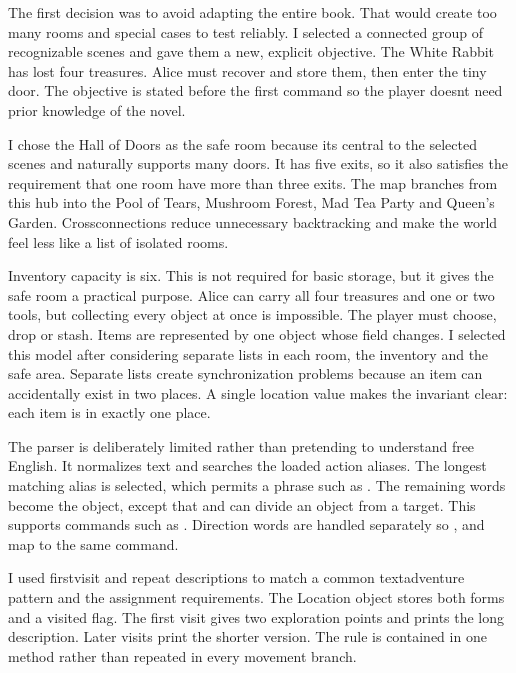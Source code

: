 \documentclass[letterpaper,10pt,english]{sphinxmanual}
\begin{document}
\sphinxAtStartPar
The first decision was to avoid adapting the entire book. That would create too
many rooms and special cases to test reliably. I selected a connected group of
recognizable scenes and gave them a new, explicit objective. The White Rabbit
has lost four treasures. Alice must recover and store them, then enter the tiny
door. The objective is stated before the first command so the player doesnt
need prior knowledge of the novel.

\sphinxAtStartPar
I chose the Hall of Doors as the safe room because its central to the selected
scenes and naturally supports many doors. It has five exits, so it also satisfies
the requirement that one room have more than three exits. The map branches from
this hub into the Pool of Tears, Mushroom Forest, Mad Tea Party and Queen’s
Garden. Cross\sphinxhyphen{}connections reduce unnecessary backtracking and make the world
feel less like a list of isolated rooms.

\sphinxAtStartPar
Inventory capacity is six. This is not required for basic storage, but it gives
the safe room a practical purpose. Alice can carry all four treasures and one or
two tools, but collecting every object at once is impossible. The player must
choose, drop or stash. Items are represented by one object whose 
field changes. I selected this model after considering separate lists in each
room, the inventory and the safe area. Separate lists create synchronization
problems because an item can accidentally exist in two places. A single location
value makes the invariant clear: each item is in exactly one place.

\sphinxAtStartPar
The parser is deliberately limited rather than pretending to understand free
English. It normalizes text and searches the loaded action aliases. The longest
matching alias is selected, which permits a phrase such as . The
remaining words become the object, except that  and  can divide an
object from a target. This supports commands such as .
Direction words are handled separately so ,  and  map
to the same command.

\sphinxAtStartPar
I used first\sphinxhyphen{}visit and repeat descriptions to match a common text\sphinxhyphen{}adventure
pattern and the assignment requirements. The Location object stores both forms
and a visited flag. The first visit gives two exploration points and prints the
long description. Later visits print the shorter version. The rule is contained
in one method rather than repeated in every movement branch.
\end{document}
